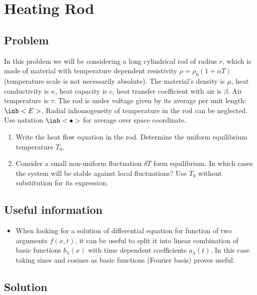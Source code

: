 \section*{Heating Rod}

\subsection*{Problem}
In this problem we will be considering a long cylindrical rod of radius $r$,
which is made of material with temperature dependent resistivity
$\rho = \rho_0 (1+\alpha T)$ (temperature scale is not necessarily absolute).
The material's density is $\mu$, heat conductivity is $\kappa$,
heat capacity is $c$, heat transfer coefficient with air is $\beta$.
Air temperature is $\tau$.
The rod is under voltage given by its average per unit length: $\inb<E>$.
Radial inhomogeneity of temperature in the rod can be neglected.
Use natation $\inb<\bullet>$ for average over space coordinate.

\begin{enumerate}
    \item Write the heat flow equation in the rod.
    Determine the uniform equilibrium temperature $T_0$.
    \item Consider a small non-uniform fluctuation $\delta T$ form equilibrium.
    In which cases the system will be stable against local fluctuations?
    Use $T_0$ without substitution for its expression.
\end{enumerate}

\subsection*{Useful information}
\begin{itemize}
    \item When looking for a solution of differential equation
    for function of two arguments $f(x,t)$,
    it can be useful to split it into linear combination of
    basic functions $b_\lambda(x)$ with time dependent coefficients
    $a_\lambda(t)$.
    In this case taking sines and cosines as basic functions
    (Fourier basis) proves useful.
\end{itemize}

\subsection*{Solution}

